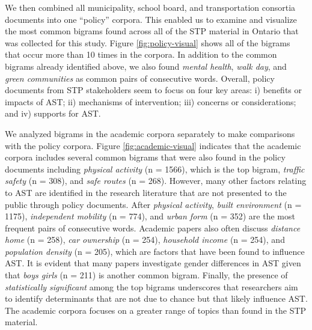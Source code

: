 \documentclass[]{elsarticle} %
\begin{document}
We then combined all municipality, school board, and transportation
consortia documents into one ``policy'' corpora. This enabled us to
examine and visualize the most common bigrams found across all of the
STP material in Ontario that was collected for this study. Figure
\ref{fig:policy-visual} shows all of the bigrams that occur more than 10
times in the corpora. In addition to the common bigrams already
identified above, we also found \emph{mental health}, \emph{walk day},
and \emph{green communities} as common pairs of consecutive words.
Overall, policy documents from STP stakeholders seem to focus on four
key areas: i) benefits or impacts of AST; ii) mechanisms of
intervention; iii) concerns or considerations; and iv) supports for AST.

We analyzed bigrams in the academic corpora separately to make
comparisons with the policy corpora. Figure \ref{fig:academic-visual}
indicates that the academic corpora includes several common bigrams that
were also found in the policy documents including \emph{physical
activity} (n = 1566), which is the top bigram, \emph{traffic safety} (n
= 308), and \emph{safe routes} (n = 268). However, many other factors
relating to AST are identified in the research literature that are not
presented to the public through policy documents. After \emph{physical
activity}, \emph{built environment} (n = 1175), \emph{independent
mobility} (n = 774), and \emph{urban form} (n = 352) are the most
frequent pairs of consecutive words. Academic papers also often discuss
\emph{distance home} (n = 258), \emph{car ownership} (n = 254),
\emph{household income} (n = 254), and \emph{population density} (n =
205), which are factors that have been found to influence AST. It is
evident that many papers investigate gender differences in AST given
that \emph{boys girls} (n = 211) is another common bigram. Finally, the
presence of \emph{statistically significant} among the top bigrams
underscores that researchers aim to identify determinants that are not
due to chance but that likely influence AST. The academic corpora
focuses on a greater range of topics than found in the STP material.
\end{document}
